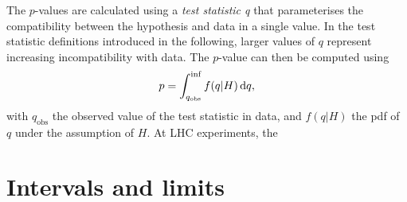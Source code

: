 The $p$-values are calculated using a \textit{test statistic q} that parameterises the compatibility between the hypothesis and data in a single value. In the test statistic definitions introduced in the following, larger values of $q$ represent increasing incompatibility with data. The $p$-value can then be computed using
\begin{equation}
	p = \int_{q_{\mathrm{obs}}}^{\inf}{f(q\vert H)\mathop{}\!\mathrm{d} q},
\end{equation}
with $q_\mathrm{obs}$ the observed value of the test statistic in data, and $f(q\vert H)$ the \gls{pdf} of $q$ under the assumption of $H$. At LHC experiments, the 

\section{Intervals and limits}

